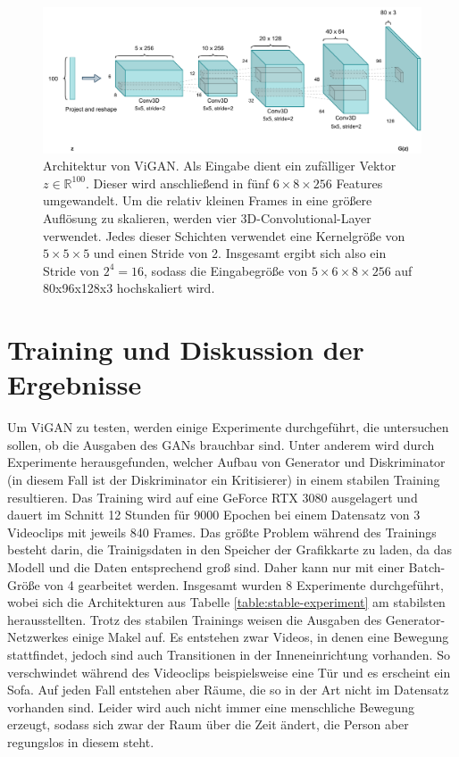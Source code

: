 \begin{figure}
    \centering
    \includegraphics[width=\textwidth]{images/ViGAN.pdf}
    \caption{Architektur von ViGAN. Als Eingabe dient ein zufälliger Vektor $z
    \in \mathbb{R}^{100}$. Dieser wird anschließend in fünf $6 \times 8 \times
    256$ Features umgewandelt. Um die relativ kleinen Frames in eine größere
    Auflösung zu skalieren, werden vier 3D-Convolutional-Layer verwendet. Jedes
    dieser Schichten verwendet eine Kernelgröße von $5 \times 5 \times 5$ und
    einen Stride von 2.  Insgesamt ergibt sich also ein Stride von $2^4 = 16$,
    sodass die Eingabegröße von $5 \times 6 \times 8 \times 256$ auf 80x96x128x3
    hochskaliert wird.}
    \label{fig:vigan}
\end{figure}

\section{Training und Diskussion der Ergebnisse}
Um ViGAN zu testen, werden einige Experimente durchgeführt, die untersuchen
sollen, ob die Ausgaben des GANs brauchbar sind. Unter anderem wird durch
Experimente herausgefunden, welcher Aufbau von Generator und Diskriminator (in
diesem Fall ist der Diskriminator ein Kritisierer) in einem stabilen Training
resultieren. Das Training wird auf eine GeForce RTX 3080 ausgelagert und dauert
im Schnitt 12 Stunden für 9000 Epochen bei einem Datensatz von 3 Videoclips mit
jeweils 840 Frames. Das größte Problem während des Trainings besteht darin, die
Trainigsdaten in den Speicher der Grafikkarte zu laden, da das Modell und die
Daten entsprechend groß sind. Daher kann nur mit einer Batch-Größe von 4
gearbeitet werden. Insgesamt wurden 8 Experimente durchgeführt, wobei sich die
Architekturen aus Tabelle \ref{table:stable-experiment} am stabilsten
herausstellten. Trotz des stabilen Trainings weisen die Ausgaben des
Generator-Netzwerkes einige Makel auf. Es entstehen zwar Videos, in denen eine
Bewegung stattfindet, jedoch sind auch Transitionen in der Inneneinrichtung
vorhanden. So verschwindet während des Videoclips beispielsweise eine Tür und es
erscheint ein Sofa. Auf jeden Fall entstehen aber Räume, die so in der Art nicht
im Datensatz vorhanden sind. Leider wird auch nicht immer eine menschliche
Bewegung erzeugt, sodass sich zwar der Raum über die Zeit ändert, die Person
aber regungslos in diesem steht.

